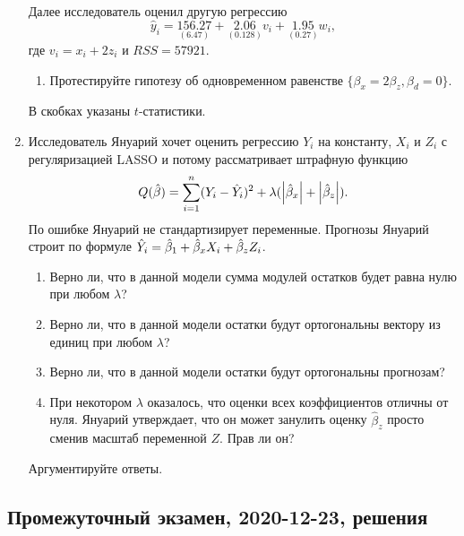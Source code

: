 \begin{enumerate}
    Далее исследователь оценил другую регрессию
    \[
    \hat{y}_{i} = \underset{(6.47)}{156.27}+\underset{(0.128)}{2.06} v_{i}+\underset{(0.27)}{1.95} w_{i},
    \]
    где $v_{i}=x_{i}+2 z_{i}$ и $RSS = 57921$.

    \begin{enumerate}[resume]
        \item Протестируйте гипотезу об одновременном равенстве $\{\beta_{x}=2 \beta_{z}, \beta_{d} = 0\}$.
    \end{enumerate}

    В скобках указаны $t$-статистики.

    \item Исследователь Януарий хочет оценить регрессию $Y_i$ на константу, $X_i$ и $Z_i$ с регуляризацией LASSO и потому рассматривает штрафную функцию 
    \[
        Q(\hat{\beta}) = \sum_{i=1}^n (Y_i - \hat Y_i)^2 + \lambda (\abs{\hat{\beta}_x} + \abs{\hat{\beta}_z}). 
    \]
    По ошибке Януарий не стандартизирует переменные.
    Прогнозы Януарий строит по формуле $\hat Y_i = \hat{\beta}_1 + \hat{\beta}_x X_i + \hat{\beta}_z Z_i$.

    \begin{enumerate}
        \item Верно ли, что в данной модели сумма модулей остатков будет равна нулю при любом $\lambda$?
        \item Верно ли, что в данной модели остатки будут ортогональны вектору из единиц при любом $\lambda$?
        \item Верно ли, что в данной модели остатки будут ортогональны прогнозам?
        \item При некотором $\lambda$ оказалось, что оценки всех коэффициентов отличны от нуля. 
        Януарий утверждает, что он может занулить оценку $\hat{\beta}_{z}$ просто сменив масштаб переменной $Z$. 
        Прав ли он?
    \end{enumerate}

    Аргументируйте ответы.
\end{enumerate}

\subsection{Промежуточный экзамен, 2020-12-23, решения}

